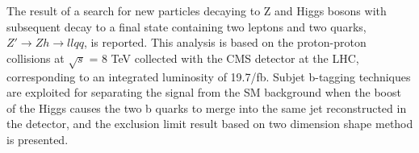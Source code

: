 % 
% 
%
The result of a search for new particles decaying to Z and Higgs bosons with subsequent decay to a final state containing two leptons and two quarks, $Z' \rightarrow Zh  \rightarrow llqq$, is reported. This analysis is based on the proton-proton collisions at $\sqrt{s}$ = 8 TeV collected with the CMS detector at the LHC, corresponding to an integrated luminosity of 19.7/fb. Subjet b-tagging techniques are exploited for separating the signal from the SM background when the boost of the Higgs causes the two b quarks to merge into the same jet reconstructed in the detector, and the exclusion limit result based on two dimension shape method is presented.
